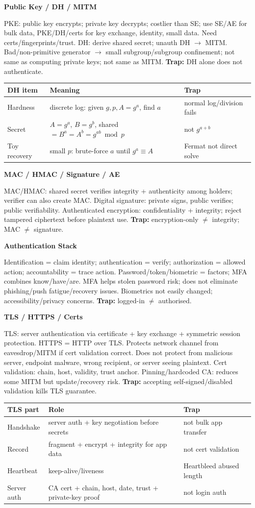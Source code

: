 \documentclass[8pt]{extarticle}
\newcommand{\h}[1]{\vspace{1pt}\textbf{#1}\par}
\newcommand{\trap}{\textbf{Trap:} }
\begin{document}
\begin{multicols*}{5}
\h{Public Key / DH / MITM}
PKE: public key encrypts; private key decrypts; costlier than SE; use SE/AE for bulk data, PKE/DH/certs for key exchange, identity, small data. Need certs/fingerprints/trust. DH: derive shared secret; unauth DH $\to$ MITM. Bad/non-primitive generator $\to$ small subgroup/subgroup confinement; not same as computing private keys; not same as MITM. \trap DH alone does not authenticate.
\begin{tabularx}{\linewidth}{@{}lYY@{}}
\toprule
DH item & Meaning & Trap\\ \midrule
Hardness & discrete log: given $g,p,A=g^a$, find $a$ & normal log/division fails\\
Secret & $A=g^a$, $B=g^b$, shared $=B^a=A^b=g^{ab}\bmod p$ & not $g^{a+b}$\\
Toy recovery & small $p$: brute-force $a$ until $g^a\equiv A$ & Fermat not direct solve\\
\bottomrule
\end{tabularx}

\h{MAC / HMAC / Signature / AE}
MAC/HMAC: shared secret verifies integrity + authenticity among holders; verifier can also create MAC. Digital signature: private signs, public verifies; public verifiability. Authenticated encryption: confidentiality + integrity; reject tampered ciphertext before plaintext use. \trap encryption-only $\ne$ integrity; MAC $\ne$ signature.

\h{Authentication Stack}
Identification = claim identity; authentication = verify; authorization = allowed action; accountability = trace action. Password/token/biometric = factors; MFA combines know/have/are. MFA helps stolen password risk; does not eliminate phishing/push fatigue/recovery issues. Biometrics not easily changed; accessibility/privacy concerns. \trap logged-in $\ne$ authorised.

\h{TLS / HTTPS / Certs}
TLS: server authentication via certificate + key exchange + symmetric session protection. HTTPS = HTTP over TLS. Protects network channel from eavesdrop/MITM if cert validation correct. Does not protect from malicious server, endpoint malware, wrong recipient, or server seeing plaintext. Cert validation: chain, host, validity, trust anchor. Pinning/hardcoded CA: reduces some MITM but update/recovery risk. \trap accepting self-signed/disabled validation kills TLS guarantee.
\begin{tabularx}{\linewidth}{@{}lYY@{}}
\toprule
TLS part & Role & Trap\\ \midrule
Handshake & server auth + key negotiation before secrets & not bulk app transfer\\
Record & fragment + encrypt + integrity for app data & not cert validation\\
Heartbeat & keep-alive/liveness & Heartbleed abused length\\
Server auth & CA cert + chain, host, date, trust + private-key proof & not login auth\\
\bottomrule
\end{tabularx}


\end{multicols*}
\end{document}
